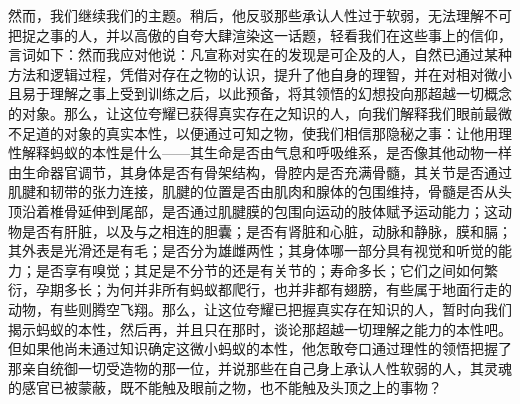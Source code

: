 然而，我们继续我们的主题。稍后，他反驳那些承认人性过于软弱，无法理解不可把捉之事的人，并以高傲的自夸大肆渲染这一话题，轻看我们在这些事上的信仰，言词如下：然而我应对他说：凡宣称对实在的发现是可企及的人，自然已通过某种方法和逻辑过程，凭借对存在之物的认识，提升了他自身的理智，并在对相对微小且易于理解之事上受到训练之后，以此预备，将其领悟的幻想投向那超越一切概念的对象。那么，让这位夸耀已获得真实存在之知识的人，向我们解释我们眼前最微不足道的对象的真实本性，以便通过可知之物，使我们相信那隐秘之事：让他用理性解释蚂蚁的本性是什么——其生命是否由气息和呼吸维系，是否像其他动物一样由生命器官调节，其身体是否有骨架结构，骨腔内是否充满骨髓，其关节是否通过肌腱和韧带的张力连接，肌腱的位置是否由肌肉和腺体的包围维持，骨髓是否从头顶沿着椎骨延伸到尾部，是否通过肌腱膜的包围向运动的肢体赋予运动能力；这动物是否有肝脏，以及与之相连的胆囊；是否有肾脏和心脏，动脉和静脉，膜和膈；其外表是光滑还是有毛；是否分为雄雌两性；其身体哪一部分具有视觉和听觉的能力；是否享有嗅觉；其足是不分节的还是有关节的；寿命多长；它们之间如何繁衍，孕期多长；为何并非所有蚂蚁都爬行，也并非都有翅膀，有些属于地面行走的动物，有些则腾空飞翔。那么，让这位夸耀已把握真实存在知识的人，暂时向我们揭示蚂蚁的本性，然后再，并且只在那时，谈论那超越一切理解之能力的本性吧。但如果他尚未通过知识确定这微小蚂蚁的本性，他怎敢夸口通过理性的领悟把握了那亲自统御一切受造物的那一位，并说那些在自己身上承认人性软弱的人，其灵魂的感官已被蒙蔽，既不能触及眼前之物，也不能触及头顶之上的事物？\par

